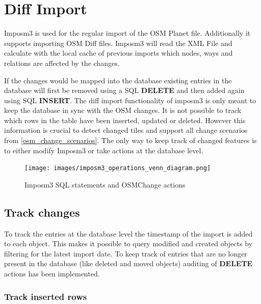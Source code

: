 \section{Diff Import}

Imposm3 is used for the regular import of the OSM Planet file. Additionally it supports importing OSM Diff files. Imposm3 will read the XML File and calculate with the local cache of previous imports which nodes, ways and relations are affected by the changes.

\noindent\begin{minipage}[t]{0.48\linewidth}
    \vspace{0pt}
    If the changes would be mapped into the database existing entries in the database will first be removed using a SQL \textbf{DELETE} and then added again using SQL \textbf{INSERT}.
    The diff import functionality of imposm3 is only meant to keep the database in sync with the OSM changes. It is not possible to track which rows in the table have been inserted, updated or deleted. However this information is crucial to detect changed tiles and support all change scenarios from \autoref{osm_change_scenarios}.
    The only way to keep track of changed features is to either modify Imposm3 or take actions at the database level.
\end{minipage}
\hfill
\begin{minipage}[t]{0.48\linewidth}
    \vspace{-20pt}
    \begin{figure}[H]
      \centering
      \texttt{[image: images/imposm3\_operations\_venn\_diagram.png]}
      \caption{Imposm3 SQL statements and OSMChange actions}
    \end{figure}
\end{minipage}


\subsection{Track changes}

To track the entries at the database level the timestamp of the import is added to each object. This makes it possible to query modified and created objects by filtering for the latest import date. To keep track of entries that are no longer present in the database (like deleted and moved objects) auditing of \textbf{DELETE} actions has been implemented.

\subsubsection{Track inserted rows}

